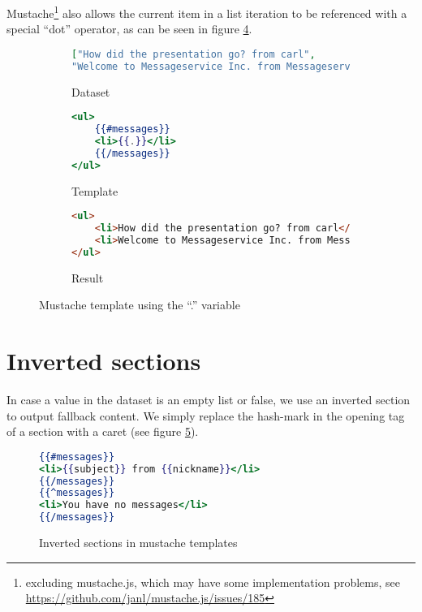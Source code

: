 \documentclass[thesis.tex]{subfiles}
\begin{document}
Mustache\footnote{excluding mustache.js, which may have some implementation
problems, see \url{https://github.com/janl/mustache.js/issues/185}} also allows
the current item in a list iteration to be referenced with a special ``dot''
operator, as can be seen in figure \ref{fig:dot-oper-example}.
\begin{figure}
	\centering
	\begin{subfigure}{\linewidth}
		\caption{Dataset}
		\label{fig:dot-oper-example.json}
		\begin{lstlisting}[language=JSON]
["How did the presentation go? from carl",
"Welcome to Messageservice Inc. from Messageservice Inc."]
		\end{lstlisting}
	\end{subfigure}
	
	\begin{subfigure}{\linewidth}
		\caption{Template}
		\label{fig:dot-oper-example.mustache}
		\begin{lstlisting}[language=mustache]
<ul>
	{{#messages}}
	<li>{{.}}</li>
	{{/messages}}
</ul>
		\end{lstlisting}
	\end{subfigure}
	
	\begin{subfigure}{\linewidth}
		\caption{Result}
		\label{fig:dot-oper-example.html}
		\begin{lstlisting}[language=HTML]
<ul>
	<li>How did the presentation go? from carl</li>
	<li>Welcome to Messageservice Inc. from Messageservice Inc.</li>
</ul>
		\end{lstlisting}
	\end{subfigure}
	\caption{Mustache template using the ``.'' variable}
	\label{fig:dot-oper-example}
\end{figure}

\section{Inverted sections}
In case a value in the dataset is an empty list or false, we use an inverted
section to output fallback content. We simply replace the hash-mark in the
opening tag of a section with a caret (see figure \ref{fig:inverted.mustache}).
\begin{figure}
	\centering
	\begin{lstlisting}[language=mustache]
{{#messages}}
<li>{{subject}} from {{nickname}}</li>
{{/messages}}
{{^messages}}
<li>You have no messages</li>
{{/messages}}
	\end{lstlisting}
	\caption{Inverted sections in mustache templates}
	\label{fig:inverted.mustache}
\end{figure}
\end{document}
